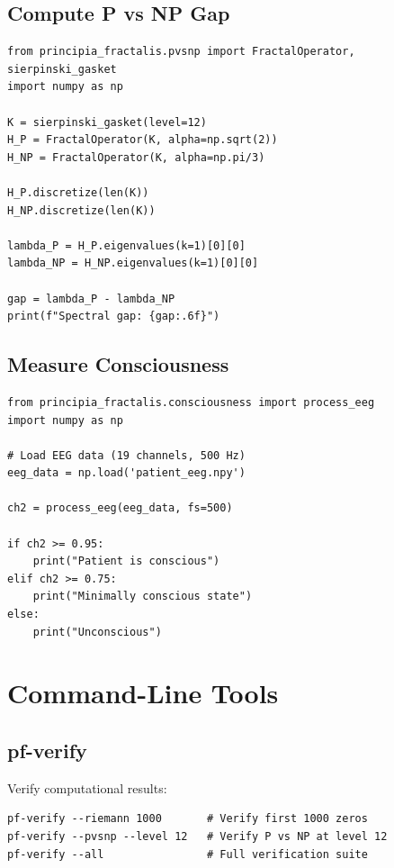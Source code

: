 \subsection{Compute P vs NP Gap}

\begin{verbatim}
from principia_fractalis.pvsnp import FractalOperator, sierpinski_gasket
import numpy as np

K = sierpinski_gasket(level=12)
H_P = FractalOperator(K, alpha=np.sqrt(2))
H_NP = FractalOperator(K, alpha=np.pi/3)

H_P.discretize(len(K))
H_NP.discretize(len(K))

lambda_P = H_P.eigenvalues(k=1)[0][0]
lambda_NP = H_NP.eigenvalues(k=1)[0][0]

gap = lambda_P - lambda_NP
print(f"Spectral gap: {gap:.6f}")
\end{verbatim}

\subsection{Measure Consciousness}

\begin{verbatim}
from principia_fractalis.consciousness import process_eeg
import numpy as np

# Load EEG data (19 channels, 500 Hz)
eeg_data = np.load('patient_eeg.npy')

ch2 = process_eeg(eeg_data, fs=500)

if ch2 >= 0.95:
    print("Patient is conscious")
elif ch2 >= 0.75:
    print("Minimally conscious state")
else:
    print("Unconscious")
\end{verbatim}

\section{Command-Line Tools}

\subsection{pf-verify}

Verify computational results:

\begin{verbatim}
pf-verify --riemann 1000       # Verify first 1000 zeros
pf-verify --pvsnp --level 12   # Verify P vs NP at level 12
pf-verify --all                # Full verification suite
\end{verbatim}

